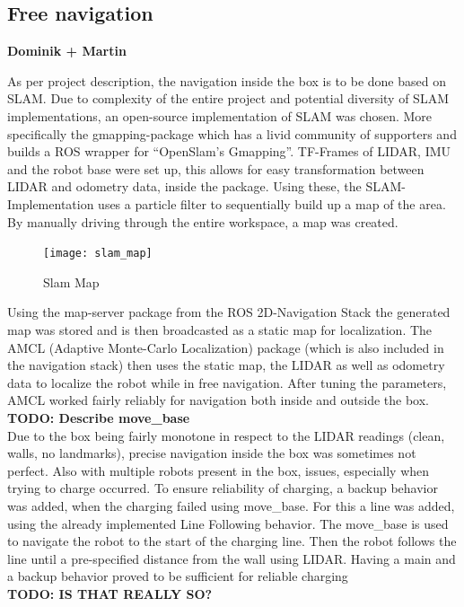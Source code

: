     \subsection{Free navigation} %
    \label{sub:mr_free_navigation}

    \textbf{Dominik + Martin}
    
    As per project description, the navigation inside the box is to be done based on SLAM. 
    Due to complexity of the entire project and potential diversity of SLAM implementations, an open-source implementation of SLAM was chosen. 
    More specifically the gmapping-package \cite{gmapping} which has a livid community of supporters and builds a ROS wrapper for “OpenSlam's Gmapping”\cite{openslam}. 
    TF-Frames of LIDAR, IMU and the robot base were set up, this allows for easy transformation between LIDAR and odometry data, inside the package. 
    Using these, the SLAM-Implementation uses a particle filter to sequentially build up a map of the area. 
    By manually driving through the entire workspace, a map was created. 
    \begin{figure}[H]
        \centering
        \texttt{[image: slam\_map]}
        \caption{Slam Map}
        \label{fig:slam_map}
    \end{figure}
    Using the map-server package from the ROS 2D-Navigation Stack \cite{navigation_stack} the generated map was stored and is then broadcasted as a static map for localization. 
    The AMCL (Adaptive Monte-Carlo Localization) package (which is also included in the navigation stack) then uses the static map, the LIDAR as well as odometry data to localize the robot while in free navigation. 
    After tuning the parameters, AMCL worked fairly reliably for navigation both inside and outside the box.\\
    \textbf{TODO: Describe move{\_}base}\\
    Due to the box being fairly monotone in respect to the LIDAR readings (clean, walls, no landmarks), precise navigation inside the box was sometimes not perfect. 
    Also with multiple robots present in the box, issues, especially when trying to charge occurred. 
    To ensure reliability of charging, a backup behavior was added, when the charging failed using move{\_}base. 
    For this a line was added, using the already implemented Line Following behavior. 
    The move{\_}base is used to navigate the robot to the start of the charging line. 
    Then the robot follows the line until a pre-specified distance from the wall using LIDAR. 
    Having a main and a backup behavior proved to be sufficient for reliable charging\\
    \textbf{TODO: IS THAT REALLY SO?}


